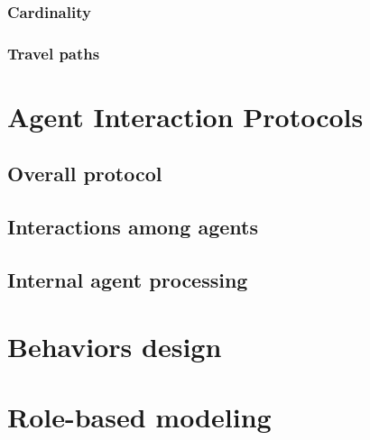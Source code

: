 \documentclass[a4paper,11pt]{report}
\begin{document}
  \subsubsection{Cardinality}
  
  \subsubsection{Travel paths}
  
  
  
  
  \section{Agent Interaction Protocols} %
  
  
  \subsection{Overall protocol} %
  
  
  \subsection{Interactions among agents}
  
  
  \subsection{Internal agent processing}


  
  
  \section{Behaviors design} %
  

  
  
  \clearpage %
  
  \section{Role-based modeling} %
  
\end{document}
